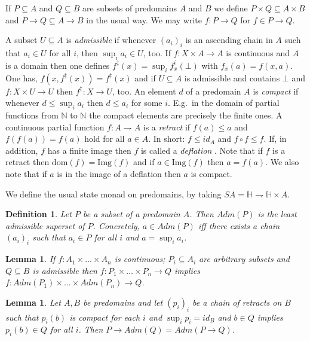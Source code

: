 \documentclass[nocopyrightspace,preprint]{sigplanconf}
\newcommand{\partfun}{\rightharpoondown}
\newcommand{\dom}[1]{\mathrm{dom}({#1})}
\newcommand{\idd}{\textit{id}}
\newcommand{\Stores}{\ensuremath{\mathbb{H}}}
\newtheorem{lemma}[theorem]{Lemma}
\newtheorem{definition}[theorem]{Definition}
\newcommand\im{\mathrm{Img}}
\begin{document}
If $P\subseteq A$ and $Q\subseteq B$ are subsets of predomains $A$ and
$B$ we define $P\times Q\subseteq A\times B$ and
$P{\rightarrow}Q\subseteq A{\rightarrow}B$ in the usual way. We may
write $f:P\rightarrow Q$ for $f\in P{\rightarrow}Q$.  

A subset $U\subseteq A$ is \emph{admissible} if whenever $(a_i)_i$ is
an ascending chain in $A$ such that $a_i\in U$ for all $i$, then
$\sup_i a_i\in U$, too. If $f:X\times A\rightarrow A$ is continuous
and $A$ is a domain then one defines $f^\ddagger(x)=\sup_if_x^i(\bot)$
with $f_x(a)=f(x,a)$. One has, $f(x,f^\ddagger(x))=f^\ddagger(x)$ and
if $U\subseteq A$ is admissible and contains $\bot$ and $f:X\times
U\rightarrow U$ then $f^\ddagger:X\rightarrow U$, too.  An element $d$
of a predomain $A$ is \emph{compact} if whenever $d\leq\sup_i a_i$
then $d\leq a_i$ for some $i$. E.g.\ in the domain of partial
functions from $\mathbb{N}$ to $\mathbb{N}$ the compact elements are
precisely the finite ones.  A continuous partial function $f:A\partfun
A$ is a \emph{retract} if $f(a)\leq a$ and $f(f(a))=f(a)$ hold for all
$a\in A$. In short: $f\leq\textit{id}_A$ and $f\circ f\leq f$. If, in
addition, $f$ has a finite image then $f$ is called a \emph{deflation}
\cite{Abramsky94domaintheory}. Note that if $f$ is a retract then $\dom f=\im(f)$
and if $a\in \im(f)$ then $a=f(a)$. We also note that if $a$ is in the
image of a deflation then $a$ is compact.
 
We define the usual state monad on predomains, by taking $ SA =
\Stores\partfun \Stores\times A $. 


\begin{definition}
Let $P$ be a subset of a predomain $A$. Then $\textit{Adm}(P)$ is
the least admissible superset of $P$. Concretely, $a\in
\textit{Adm}(P)$ iff there exists a chain $(a_i)_i$ such that $a_i\in
P$ for all $i$ and $a=\sup_i a_i$.
\end{definition}
\begin{lemma}\label{funad}
If $f:A_1\times\dots\times A_n$ is continuous; $P_i\subseteq A_i$ are
arbitrary subsets and $Q\subseteq B$ is admissible then
$f:P_1\times\dots \times P_n\rightarrow Q$ implies
$f:\textit{Adm}(P_1)\times\dots \times \textit{Adm}(P_n)\rightarrow
Q$.
\end{lemma}
\begin{lemma}\label{func}
Let $A,B$ be predomains and let $(p_i)_i$ be a chain of retracts on
$B$ such that $p_i(b)$ is compact for each $i$ and $\sup_i p_i =
\idd_B$ and $b\in Q$ implies $p_i(b)\in Q$ for all $i$.
Then $P{\rightarrow}\textit{Adm}(Q)=\textit{Adm}(P\rightarrow Q)$.
\end{lemma}
\end{document}
